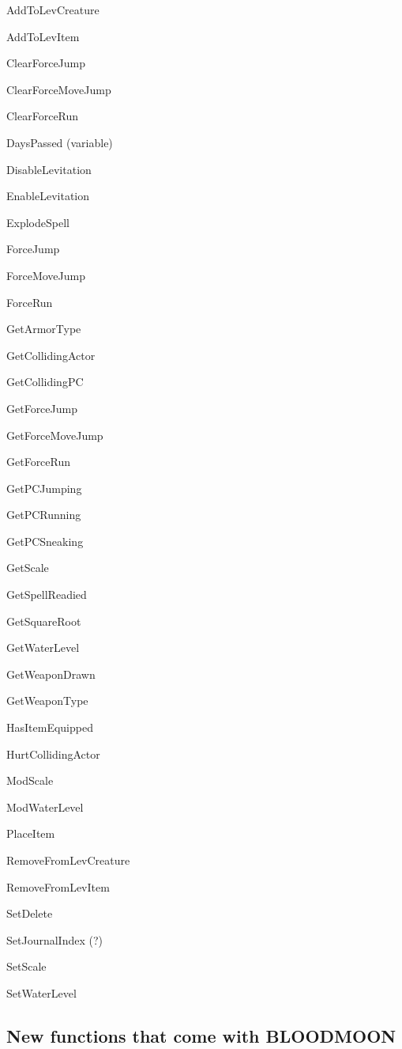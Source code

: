 
AddToLevCreature

AddToLevItem

ClearForceJump

ClearForceMoveJump

ClearForceRun

DaysPassed (variable)

DisableLevitation

EnableLevitation

ExplodeSpell

ForceJump

ForceMoveJump

ForceRun

GetArmorType

GetCollidingActor

GetCollidingPC

GetForceJump

GetForceMoveJump

GetForceRun

GetPCJumping

GetPCRunning

GetPCSneaking

GetScale

GetSpellReadied

GetSquareRoot

GetWaterLevel

GetWeaponDrawn

GetWeaponType

HasItemEquipped

HurtCollidingActor

ModScale

ModWaterLevel

PlaceItem

RemoveFromLevCreature

RemoveFromLevItem

SetDelete

SetJournalIndex (?)

SetScale

SetWaterLevel

\hypertarget{new-functions-that-come-with-bloodmoon}{%
\subsection{New functions that come with
BLOODMOON}\label{new-functions-that-come-with-bloodmoon}}


